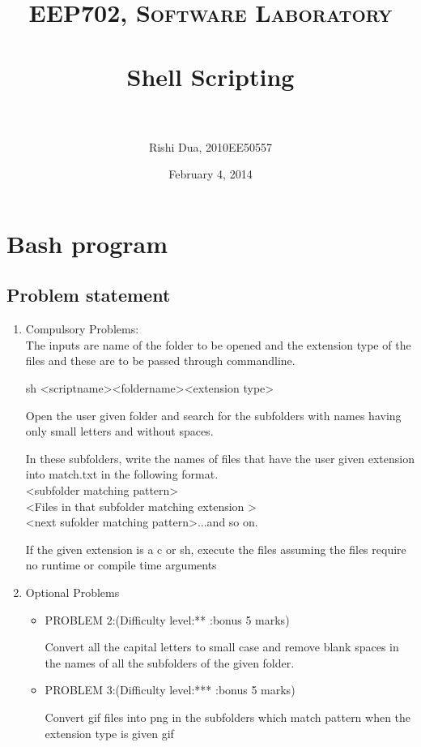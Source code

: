 \documentclass[paper=a4, fontsize=11pt]{scrartcl} %
\title{	
\normalfont \normalsize 
\textsc{EEP702, Software Laboratory} \\ [25pt] %
\horrule{0.5pt} \\[0.4cm] %
\huge Shell Scripting \\ %
\horrule{2pt} \\[0.5cm] %
}
\author{Rishi Dua, 2010EE50557} %
\date{\normalsize February 4, 2014} %
\numberwithin{equation}{section} %
\numberwithin{figure}{section} %
\numberwithin{table}{section} %
\begin{document}
\maketitle %


\section{Bash program}


\subsection{Problem statement}
\begin {enumerate}
\item Compulsory Problems: \\
The inputs are name of the folder to be opened and the extension type of the files and these are to be passed through commandline.

sh <scriptname><foldername><extension type>

Open the user given folder and search for the subfolders with names having only small letters and without spaces.

In these subfolders, write the names of files that have the user given extension into match.txt in the following format.\\
<subfolder matching pattern>\\
<Files in that subfolder matching extension >\\
<next sufolder matching pattern>...and so on.

If the given extension is a c or sh, execute the files assuming the files require no runtime or compile time arguments

\item Optional Problems
\begin {itemize}
\item PROBLEM 2:(Difficulty level:** :bonus 5 marks)

Convert all the capital letters to small case and remove blank spaces in the names of all the subfolders
of the given folder.

\item PROBLEM 3:(Difficulty level:*** :bonus 5 marks)

Convert gif files into png in the subfolders which match pattern when the extension type is given gif

\end{itemize}
\end{enumerate}
\end{document}
